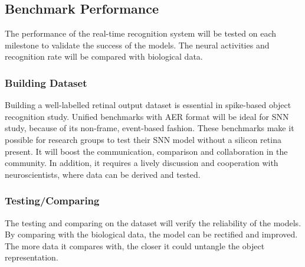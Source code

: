 \subsection{Benchmark Performance}
The performance of the real-time recognition system will be tested on each milestone to validate the success of the models.
The neural activities and recognition rate will be compared with biological data.
\subsubsection{Building Dataset}
Building a well-labelled retinal output dataset is essential in spike-based object recognition study.
Unified benchmarks with AER format will be ideal for SNN study, because of its non-frame, event-based fashion.
These benchmarks make it possible for research groups to test their SNN model without a silicon retina present.
It will boost the communication, comparison and collaboration in the community.
In addition, it requires a lively discussion and cooperation with neuroscientists, where data can be derived and tested.
\subsubsection{Testing/Comparing}
The testing and comparing on the dataset will verify the reliability of the models.
By comparing with the biological data, the model can be rectified and improved.
The more data it compares with, the closer it could untangle the object representation. 



